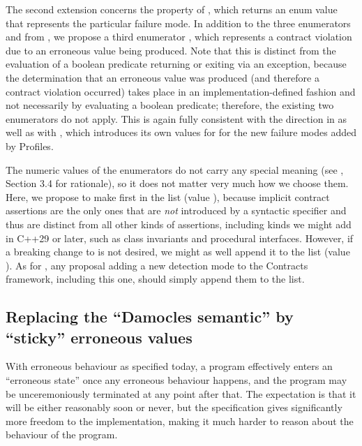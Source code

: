 The second extension concerns the  property of , which returns an enum value that represents the particular failure mode. In addition to the three enumerators  and  from \cite{P2900R13}, we propose a third enumerator , which represents a contract violation due to an erroneous value being produced. Note that this is distinct from the evaluation of a boolean predicate returning  or exiting via an exception, because the determination that an erroneous value was produced (and therefore a contract violation occurred) takes place in an implementation-defined fashion and not necessarily by evaluating a boolean predicate; therefore, the existing two enumerators do not apply. This is again fully consistent with the direction in \cite{P3100R1} as well as with \cite{P3081R1}, which introduces its own values for  for the new failure modes added by Profiles.

The numeric values of the enumerators do not carry any special meaning (see \cite{P3327R0}, Section 3.4 for rationale), so it does not matter very much how we choose them. Here, we propose to make  first in the list (value  ), because implicit contract assertions are the only ones that are \emph{not} introduced by a syntactic specifier and thus are distinct from all other kinds of assertions, including kinds we might add in C++29 or later, such as class invariants and procedural interfaces. However, if a breaking change to \cite{P2900R13} is not desired, we might as well  append it to the list (value ). As for , any proposal adding a new detection mode to the Contracts framework, including this one, should simply append them to the list.

\subsection{Replacing the ``Damocles semantic'' by ``sticky'' erroneous values}
\label{damocles}

With erroneous behaviour as specified today, a program effectively enters an ``erroneous state'' once any erroneous behaviour happens, and the program may be unceremoniously terminated at any point after that.  The expectation is that it will be either reasonably soon or never, but the specification gives significantly more freedom to the implementation, making it much harder to reason about the behaviour of the program.

